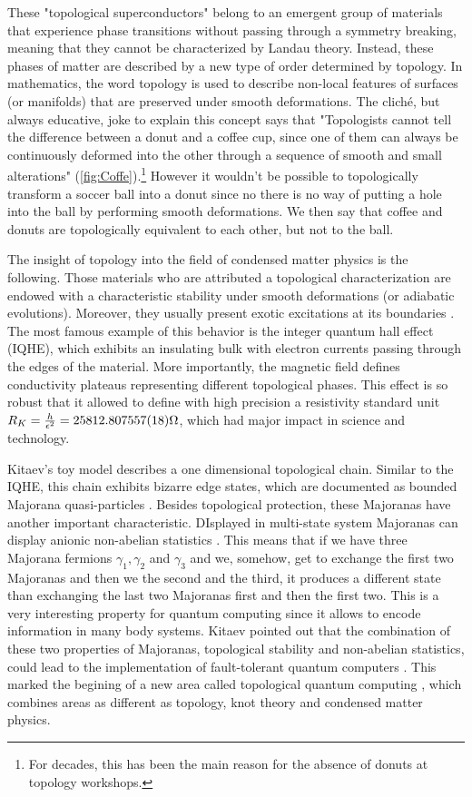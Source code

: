 These "topological superconductors" belong to an emergent group of materials that experience phase transitions without passing through a symmetry breaking, meaning that they cannot be characterized by Landau theory. Instead, these phases of matter are described by  a new type of  order determined by topology. In mathematics, the word topology is used to describe non-local features of surfaces (or manifolds) that are preserved under smooth deformations. The clich\'e, but always educative, joke to explain this concept says that "Topologists cannot tell the difference between a donut and a coffee cup, since one of them 
can always be continuously deformed into the other through a
sequence of smooth and small alterations" (\ref{fig:Coffe}).\footnote{For decades, this has been the main reason for the absence of donuts at topology workshops.} However it wouldn't be possible to topologically transform a soccer ball into  a donut since no there is no way of putting  a hole into the ball by performing smooth deformations. We then say that coffee and donuts are topologically equivalent to each other, but not to the ball. 



The insight of topology into  the field of condensed matter physics is the following. Those materials who are attributed a topological characterization are endowed with a characteristic stability under smooth deformations (or adiabatic evolutions). Moreover, they usually present exotic excitations at its boundaries . The most famous example of this behavior is the integer quantum hall effect (IQHE), which exhibits an insulating bulk with electron currents passing through the edges of the material. More importantly, the magnetic field defines conductivity plateaus representing different topological phases. This effect is so robust that it allowed to define with high precision a resistivity standard unit $ R_K =\frac{h}{\epsilon^2} = 25812.807557(18) \Omega$, which had major impact in science and technology. 


Kitaev's toy model describes a one dimensional  topological chain. Similar to the IQHE, this chain exhibits bizarre edge states, which are documented as bounded Majorana quasi-particles . Besides topological protection, these Majoranas have another important characteristic. DIsplayed in multi-state system Majoranas can display anionic non-abelian statistics \citep{kitaev_fault-tolerant_2003}. This means that if we have three Majorana fermions $\gamma_1 ,\gamma_2 $ and $\gamma_3$ and we, somehow, get to exchange the first two Majoranas and then we  the second and the third, it produces a different state than exchanging the last two Majoranas first and then the first two. This is a very interesting property for quantum computing since it allows to encode information in many body systems.  Kitaev pointed out that the combination of these two properties of Majoranas, topological stability and non-abelian statistics, could lead  to the implementation of fault-tolerant quantum computers . This marked the begining of a new area called  topological quantum computing \cite{pachos_introduction_2012}, which combines areas as different as topology, knot theory \cite{turaev_book} and condensed matter physics. 

